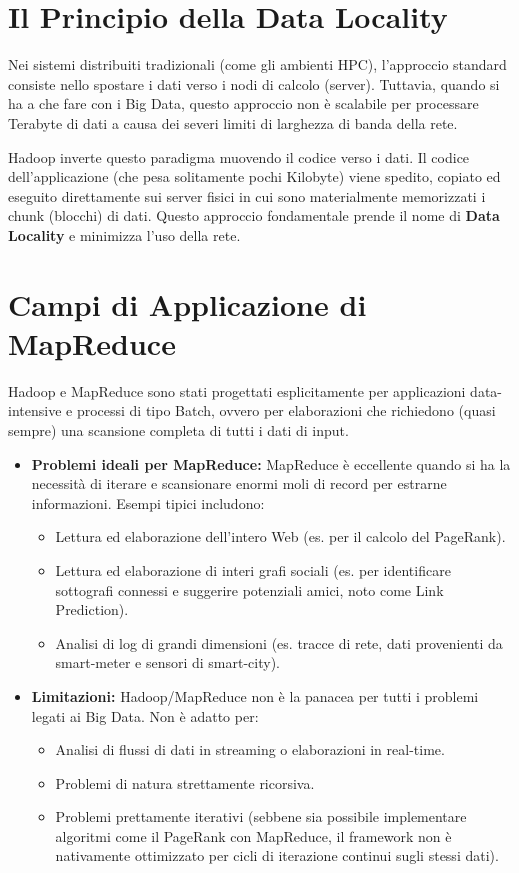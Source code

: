\section{Il Principio della Data Locality}
Nei sistemi distribuiti tradizionali (come gli ambienti HPC), l'approccio standard consiste nello spostare i dati verso i nodi di calcolo (server). Tuttavia, quando si ha a che fare con i Big Data, questo approccio non è scalabile per processare Terabyte di dati a causa dei severi limiti di larghezza di banda della rete.

Hadoop inverte questo paradigma muovendo il codice verso i dati. Il codice dell'applicazione (che pesa solitamente pochi Kilobyte) viene spedito, copiato ed eseguito direttamente sui server fisici in cui sono materialmente memorizzati i chunk (blocchi) di dati. Questo approccio fondamentale prende il nome di \textbf{Data Locality} e minimizza l'uso della rete.

\section{Campi di Applicazione di MapReduce}
Hadoop e MapReduce sono stati progettati esplicitamente per applicazioni data-intensive e processi di tipo Batch, ovvero per elaborazioni che richiedono (quasi sempre) una scansione completa di tutti i dati di input.

\begin{itemize}
    \item \textbf{Problemi ideali per MapReduce:} MapReduce è eccellente quando si ha la necessità di iterare e scansionare enormi moli di record per estrarne informazioni. Esempi tipici includono:
    \begin{itemize}
        \item Lettura ed elaborazione dell'intero Web (es. per il calcolo del PageRank).
        \item Lettura ed elaborazione di interi grafi sociali (es. per identificare sottografi connessi e suggerire potenziali amici, noto come Link Prediction).
        \item Analisi di log di grandi dimensioni (es. tracce di rete, dati provenienti da smart-meter e sensori di smart-city).
    \end{itemize}
    \item \textbf{Limitazioni:} Hadoop/MapReduce non è la panacea per tutti i problemi legati ai Big Data. Non è adatto per:
    \begin{itemize}
        \item Analisi di flussi di dati in streaming o elaborazioni in real-time.
        \item Problemi di natura strettamente ricorsiva.
        \item Problemi prettamente iterativi (sebbene sia possibile implementare algoritmi come il PageRank con MapReduce, il framework non è nativamente ottimizzato per cicli di iterazione continui sugli stessi dati).
    \end{itemize}
\end{itemize}

